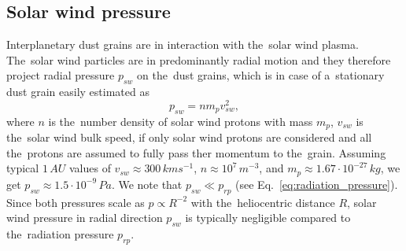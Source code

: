 \subsection{Solar wind pressure} \label{ch:solar_wind_pressure}

Interplanetary dust grains are in interaction with the~solar wind plasma. The~solar wind particles are in predominantly radial motion and they therefore project radial pressure $p_{sw}$ on the~dust grains, which is in case of a~stationary dust grain easily estimated \citep{shue1998magnetopause} as
\begin{equation}
    p_{sw} = n m_p v^2_{sw},  
\end{equation}
where $n$ is the~number density of solar wind protons with mass $m_p$, $v_{sw}$ is the~solar wind bulk speed, if only solar wind protons are considered and all the~protons are assumed to fully pass ther momentum to the~grain. Assuming typical $1 \, \si{AU}$ values of $v_{sw} \approx 300 \, \si{km s^{-1}}$, $n \approx 10^7 \, \si{m^{-3}}$, and $m_p \approx 1.67 \cdot 10^{-27} \, \si{kg}$, we get $p_{sw} \approx 1.5 \cdot 10^{-9} \, \si{Pa}$. We note that $p_{sw} \ll p_{rp}$ (see Eq.~\ref{eq:radiation_pressure}). Since both pressures scale as $p \propto R^{-2}$ with the~heliocentric distance $R$, solar wind pressure in radial direction $p_{sw}$ is typically negligible compared to the~radiation pressure $p_{rp}$.

